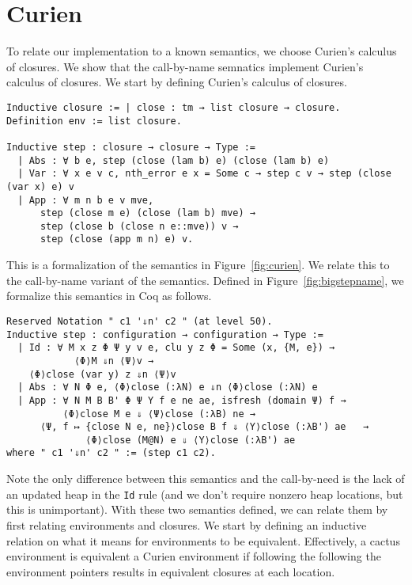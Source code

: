 \section{Curien}

To relate our implementation to a known semantics, we choose Curien's calculus
of closures. We show that the call-by-name \ce semnatics implement Curien's
calculus of closures. We start by defining Curien's calculus of closures. 

\begin{verbatim}
Inductive closure := | close : tm → list closure → closure. 
Definition env := list closure.

Inductive step : closure → closure → Type := 
  | Abs : ∀ b e, step (close (lam b) e) (close (lam b) e)
  | Var : ∀ x e v c, nth_error e x = Some c → step c v → step (close (var x) e) v
  | App : ∀ m n b e v mve, 
      step (close m e) (close (lam b) mve) → 
      step (close b (close n e::mve)) v → 
      step (close (app m n) e) v.
\end{verbatim}

This is a formalization of the semantics in Figure~\ref{fig:curien}. We relate
this to the call-by-name variant of the \ce semantics. Defined in
Figure~\ref{fig:bigstepname}, we formalize this semantics in Coq as follows.

\begin{verbatim}
Reserved Notation " c1 '⇓n' c2 " (at level 50).
Inductive step : configuration → configuration → Type :=
  | Id : ∀ M x z Φ Ψ y v e, clu y z Φ = Some (x, {M, e}) → 
            ⟨Φ⟩M ⇓n ⟨Ψ⟩v →
    ⟨Φ⟩close (var y) z ⇓n ⟨Ψ⟩v
  | Abs : ∀ N Φ e, ⟨Φ⟩close (:λN) e ⇓n ⟨Φ⟩close (:λN) e
  | App : ∀ N M B B' Φ Ψ Υ f e ne ae, isfresh (domain Ψ) f → 
          ⟨Φ⟩close M e ⇓ ⟨Ψ⟩close (:λB) ne → 
      ⟨Ψ, f ↦ {close N e, ne}⟩close B f ⇓ ⟨Υ⟩close (:λB') ae   →
              ⟨Φ⟩close (M@N) e ⇓ ⟨Υ⟩close (:λB') ae
where " c1 '⇓n' c2 " := (step c1 c2).
\end{verbatim}

Note the only difference between this semantics and the call-by-need is the lack
of an updated heap in the \texttt{Id} rule (and we don't require nonzero heap
locations, but this is unimportant). With these two semantics defined, we can
relate them by first relating environments and closures. We start by defining an
inductive relation on what it means for environments to be equivalent.
Effectively, a cactus environment is equivalent a Curien environment if
following the following the environment pointers results in equivalent closures
at each location. 


